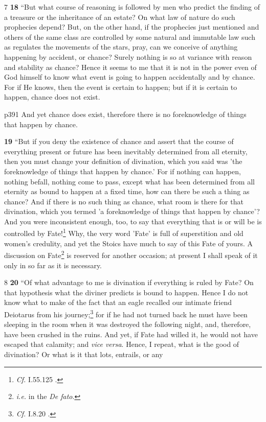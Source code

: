 7
\textbf{18} ``But what course of reasoning is followed by men who predict the finding of a treasure or the inheritance of an estate? On what law of nature do such prophecies depend? But, on the other hand, if the prophecies just mentioned and others of the same class are controlled by some natural and immutable law such as regulates the movements of the stars, pray, can we conceive of anything happening by accident, or chance? Surely nothing is so at variance with reason and stability as chance? Hence it seems to me that it is not in the power even of God himself to know what event is going to happen accidentally and by chance. For if He knows, then the event is certain to happen; but if it is certain to happen, chance does not exist.

p391 And yet chance does exist, therefore there is no foreknowledge of things that happen by chance.

\textbf{19} ``But if you deny the existence of chance and assert that the course of everything present or future has been inevitably determined from all eternity, then you must change your definition of divination, which you said was 'the foreknowledge of things that happen by chance.' For if nothing can happen, nothing befall, nothing come to pass, except what has been determined from all eternity as bound to happen at a fixed time, how can there be such a thing as chance? And if there is no such thing as chance, what room is there for that divination, which you termed 'a foreknowledge of things that happen by chance'? And you were inconsistent enough, too, to say that everything that is or will be is controlled by Fate!\texthebrew{}\footnote{\emph{Cf.}
I.55.125 .

} Why, the very word 'Fate' is full of superstition and old women's credulity, and yet the Stoics have much to say of this Fate of yours. A discussion on Fate\texthebrew{}\footnote{\emph{i.e.} in the \emph{De fato}.

} is reserved for another occasion; at present I shall speak of it only in so far as it is necessary.

8
\textbf{20} ``Of what advantage to me is divination if everything is ruled by Fate? On that hypothesis what the diviner predicts is bound to happen. Hence I do not know what to make of the fact that an eagle recalled our intimate friend Deiotarus from his journey;\texthebrew{}\footnote{\emph{Cf.}
I.8.20 .

} for if he had not turned back he must have been sleeping in the room when it was destroyed the following night, and, therefore, have been crushed in the ruins. And yet, if Fate had willed it, he would not have escaped that calamity; and \emph{vice versa}. Hence, I repeat, what is the good of divination? Or what is it that lots, entrails, or any

